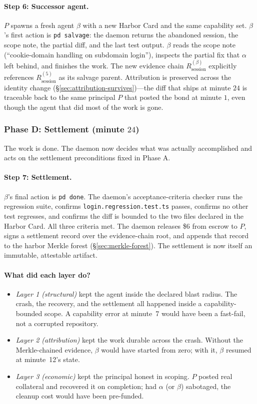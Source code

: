 \documentclass[11pt,a4paper]{article}
\theoremstyle{definition}
\theoremstyle{remark}
\begin{document}
\paragraph{Step 6: Successor agent.} $P$ spawns a fresh agent $\beta$ with a new Harbor Card and the same capability set. $\beta$'s first action is \texttt{pd salvage}: the daemon returns the abandoned session, the scope note, the partial diff, and the last test output. $\beta$ reads the scope note (``cookie-domain handling on subdomain login''), inspects the partial fix that $\alpha$ left behind, and finishes the work. The new evidence chain $R_{\text{session}}^{(\beta)}$ explicitly references $R_{\text{session}}^{(5)}$ as its salvage parent. Attribution is preserved across the identity change (\S\ref{sec:attribution-survives})---the diff that ships at minute $24$ is traceable back to the same principal $P$ that posted the bond at minute $1$, even though the agent that did most of the work is gone.

\subsubsection*{Phase D: Settlement (minute $24$)}

The work is done. The daemon now decides what was actually accomplished and acts on the settlement preconditions fixed in Phase A.

\paragraph{Step 7: Settlement.} $\beta$'s final action is \texttt{pd done}. The daemon's acceptance-criteria checker runs the regression suite, confirms \texttt{login\allowbreak.regression\allowbreak.test\allowbreak.ts} passes, confirms no other test regresses, and confirms the diff is bounded to the two files declared in the Harbor Card. All three criteria met. The daemon releases \$6 from escrow to $P$, signs a settlement record over the evidence-chain root, and appends that record to the harbor Merkle forest (\S\ref{sec:merkle-forest}). The settlement is now itself an immutable, attestable artifact.

\paragraph{What did each layer do?}
\begin{itemize}[nosep]
  \item \emph{Layer 1 (structural)} kept the agent inside the declared blast radius. The crash, the recovery, and the settlement all happened inside a capability-bounded scope. A capability error at minute~7 would have been a fast-fail, not a corrupted repository.
  \item \emph{Layer 2 (attribution)} kept the work durable across the crash. Without the Merkle-chained evidence, $\beta$ would have started from zero; with it, $\beta$ resumed at minute~12's state.
  \item \emph{Layer 3 (economic)} kept the principal honest in scoping. $P$ posted real collateral and recovered it on completion; had $\alpha$ (or $\beta$) sabotaged, the cleanup cost would have been pre-funded.
\end{itemize}
\end{document}
